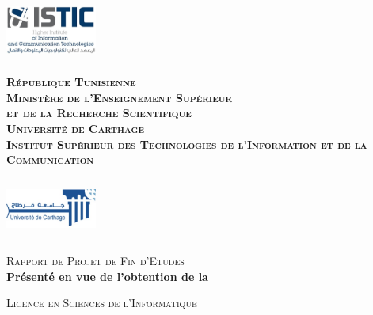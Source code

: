 \begin{titlepage}

\newcommand{\HRule}{\rule{\linewidth}{0.5mm}} %

\center %
 


\begin{minipage}[l]{0.2\columnwidth}
\includegraphics[width=3cm,height=2cm]{../assets/logo_istic.jpg}\\
\end{minipage}
\hfill
\begin{minipage}[l]{0.5\columnwidth}
\centering
\footnotesize
\textbf{\textsc{République Tunisienne}}\\
\textbf{\textsc{Ministère de l'Enseignement Supérieur\\
et de la Recherche Scientifique}}\\
\medskip 
\textbf{\textsc{Université de Carthage}}\\
\medskip 
\textbf{\textsc{Institut Supérieur des Technologies de l'Information et de la Communication}}
\end{minipage}
\hfill
\begin{minipage}[l]{0.2\columnwidth}
\includegraphics[width=3cm,height=2cm]{../assets/logo_ucar.jpg}\\
\end{minipage}

\vskip1cm
\textsc{\large Rapport de Projet de Fin d'Etudes}\\[0.5cm] %

\textbf{Présenté en vue de l'obtention de la}

\textsc{\large Licence en Sciences de l'Informatique}\\[0.5cm] %


\end{titlepage}
